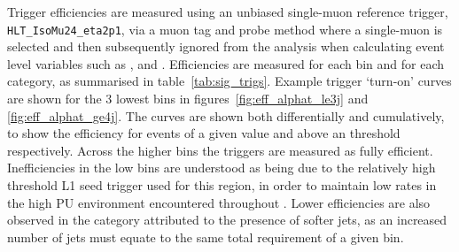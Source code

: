 Trigger efficiencies are measured using an unbiased single-muon reference
trigger,
\\\verb!HLT_IsoMu24_eta2p1!, via a muon tag and probe method where a
single-muon is selected and then subsequently ignored from the analysis when 
calculating event level variables such as \HT, \mht and \alphat. Efficiencies 
are measured for each \HT bin and for each \nj category, as summarised in 
table~\ref{tab:sig_trigs}. Example trigger `turn-on' curves are shown for the 3 
lowest \HT bins in figures~\ref{fig:eff_alphat_le3j} and \ref{fig:eff_alphat_ge4j}.
The curves are shown both differentially and cumulatively, to show the
efficiency for events of a given \alphat value and above an \alphat threshold
respectively.
Across the higher \HT  bins the triggers are measured as fully efficient.
Inefficiencies in the low \HT bins are
understood as being due to the relatively high threshold L1 seed trigger used
for this region, in order to maintain
low rates in the high PU environment encountered throughout \runone. Lower 
efficiencies are also observed in the \njhigh category attributed to the presence of 
softer jets, as an increased number of jets must equate to the same total \HT 
requirement of a given bin.

